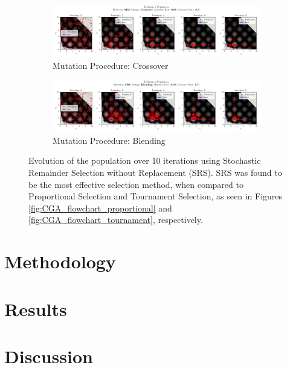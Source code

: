 \documentclass[10pt]{article}
\begin{document}
\begin{figure}[H]
    \centering
    \begin{subfigure}{\textwidth}
        \centering
        \includegraphics[width=\textwidth]{../figures/KBF/10_iters/SRS/Crossover/0.05_0.7_Population.png}
        \caption{Mutation Procedure: Crossover}
        \label{fig:CGA_flowchart_SRS_crossover}
    \end{subfigure}
    \begin{subfigure}{\textwidth}
        \centering
        \includegraphics[width=\textwidth]{../figures/KBF/10_iters/SRS/Blending/0.05_0.7_Population.png}
        \caption{Mutation Procedure: Blending}
        \label{fig:CGA_flowchart_SRS_blending}
    \end{subfigure}
    \captionsetup{justification=centering}
    \caption{Evolution of the population over 10 iterations using Stochastic Remainder Selection without Replacement (SRS). SRS was found to be the most effective selection method, when compared to Proportional Selection and Tournament Selection, as seen in Figures \ref{fig:CGA_flowchart_proportional} and \ref{fig:CGA_flowchart_tournament}, respectively.}
    \label{fig:CGA_flowchart_SRS}
\end{figure}


\section{Methodology}
\label{sec:CGA_QEG_comparison}
\section{Results}
\section{Discussion}
\end{document}
